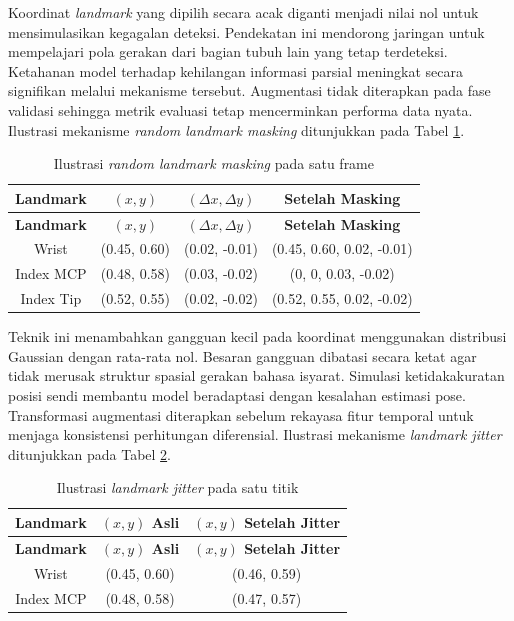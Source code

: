 Koordinat \textit{landmark} yang dipilih secara acak diganti menjadi nilai nol untuk mensimulasikan kegagalan deteksi.
Pendekatan ini mendorong jaringan untuk mempelajari pola gerakan dari bagian tubuh lain yang tetap terdeteksi.
Ketahanan model terhadap kehilangan informasi parsial meningkat secara signifikan melalui mekanisme tersebut.
Augmentasi tidak diterapkan pada fase validasi sehingga metrik evaluasi tetap mencerminkan performa data nyata.
Ilustrasi mekanisme \textit{random landmark masking} ditunjukkan pada Tabel \ref{tab:3-landmark-masking-example}.

\begin{longtable}{|c|c|c|c|}
\caption{Ilustrasi \textit{random landmark masking} pada satu frame}
\label{tab:3-landmark-masking-example} \\ \hline
\textbf{Landmark} & \textbf{$(x,y)$} & \textbf{$(\Delta x, \Delta y)$} & \textbf{Setelah Masking} \\ \hline
\endfirsthead
\hline
\textbf{Landmark} & \textbf{$(x,y)$} & \textbf{$(\Delta x, \Delta y)$} & \textbf{Setelah Masking} \\ \hline
\endhead
Wrist & (0.45, 0.60) & (0.02, -0.01) & (0.45, 0.60, 0.02, -0.01) \\ \hline
Index MCP & (0.48, 0.58) & (0.03, -0.02) & (0, 0, 0.03, -0.02) \\ \hline
Index Tip & (0.52, 0.55) & (0.02, -0.02) & (0.52, 0.55, 0.02, -0.02) \\ \hline
\end{longtable}

Teknik ini menambahkan gangguan kecil pada koordinat menggunakan distribusi Gaussian dengan rata-rata nol.
Besaran gangguan dibatasi secara ketat agar tidak merusak struktur spasial gerakan bahasa isyarat.
Simulasi ketidakakuratan posisi sendi membantu model beradaptasi dengan kesalahan estimasi pose.
Transformasi augmentasi diterapkan sebelum rekayasa fitur temporal untuk menjaga konsistensi perhitungan diferensial.
Ilustrasi mekanisme \textit{landmark jitter} ditunjukkan pada Tabel \ref{tab:3-jitter-example}.

\begin{longtable}{|c|c|c|}
\caption{Ilustrasi \textit{landmark jitter} pada satu titik}
\label{tab:3-jitter-example} \\ \hline
\textbf{Landmark} & \textbf{$(x,y)$ Asli} & \textbf{$(x,y)$ Setelah Jitter} \\ \hline
\endfirsthead
\hline
\textbf{Landmark} & \textbf{$(x,y)$ Asli} & \textbf{$(x,y)$ Setelah Jitter} \\ \hline
\endhead
Wrist & (0.45, 0.60) & (0.46, 0.59) \\ \hline
Index MCP & (0.48, 0.58) & (0.47, 0.57) \\ \hline
\end{longtable}

